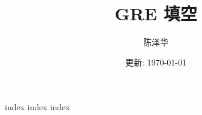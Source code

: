 \documentclass{report}
\title{GRE 填空}
\author{陈泽华}
\date{更新: \today}
\begin{document}
  \maketitle
  \tableofcontents

  {index}
  {index}
  {index}
\end{document}

